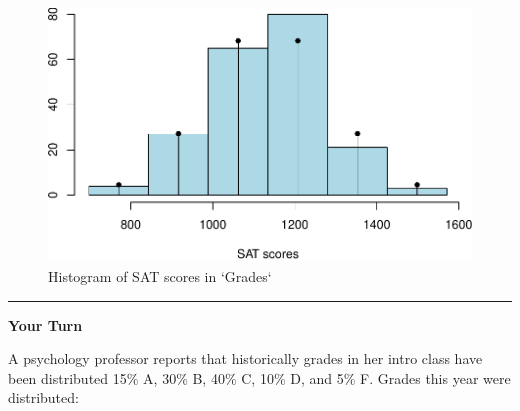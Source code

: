 \documentclass[
]{article}
\newenvironment{Shaded}{\begin{snugshade}}{\end{snugshade}}
\newcommand{\AttributeTok}[1]{\textcolor[rgb]{0.77,0.63,0.00}{#1}}
\newcommand{\ConstantTok}[1]{\textcolor[rgb]{0.00,0.00,0.00}{#1}}
\newcommand{\DecValTok}[1]{\textcolor[rgb]{0.00,0.00,0.81}{#1}}
\newcommand{\FunctionTok}[1]{\textcolor[rgb]{0.00,0.00,0.00}{#1}}
\newcommand{\NormalTok}[1]{#1}
\newcommand{\OtherTok}[1]{\textcolor[rgb]{0.56,0.35,0.01}{#1}}
\newcommand{\SpecialCharTok}[1]{\textcolor[rgb]{0.00,0.00,0.00}{#1}}
\newcommand{\StringTok}[1]{\textcolor[rgb]{0.31,0.60,0.02}{#1}}
\begin{document}
\begin{Shaded}
\end{Shaded}

\begin{figure}

{\centering \includegraphics{SDM-CHAP22_files/figure-latex/normsat-1} 

}

\caption{Histogram of SAT scores in `Grades`}\label{fig:normsat}
\end{figure}

\begin{center}\rule{0.5\linewidth}{0.5pt}\end{center}

\textbf{Your Turn}

A psychology professor reports that historically grades in her intro class have been distributed
15\% A, 30\% B, 40\% C, 10\% D, and 5\% F. Grades this year were distributed:
\end{document}
